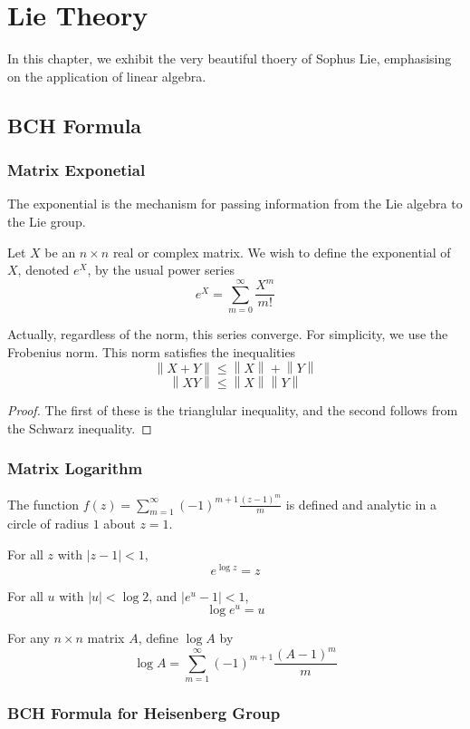
\chapter{Lie Theory}
In this chapter, we exhibit the very beautiful thoery of Sophus Lie, emphasising on the application of linear algebra.

\section{BCH Formula}
\subsection{Matrix Exponetial}
The exponential is the mechanism for passing information from the Lie algebra to the Lie group.

Let $X$ be an $n\times n$ real or complex matrix. We wish to define the exponential of $X$, denoted $e^X$, by the usual power series
\[e^X=\sum_{m=0}^\infty \frac{X^m}{m!}\] 

Actually, regardless of the norm, this series converge. For simplicity, we use the Frobenius norm. This norm satisfies the inequalities 
\[\left\|X+Y\right\|\le\left\|X\right\|+\left\|Y\right\|\]
\[\left\|XY\right\|\le \left\|X\right\|\left\|Y\right\|\] 
\begin{proof}
    The first of these is the trianglular inequality, and the second follows from the Schwarz inequality.
\end{proof}

\subsection{Matrix Logarithm}
\begin{lemma}
    The function $f(z)=\sum_{m=1}^\infty (-1)^{m+1}\frac{(z-1)^m}{m}$ is defined and analytic in a circle of radius $1$ about $z=1$.

    For all $z$ with $\left|z-1\right|<1$,\[e^{\log z}=z\] 

    For all $u$ with $\left|u\right|<\log 2$, and $\left|e^u-1\right|<1$, \[\log e^u=u\]
\end{lemma}
\begin{definition}
    For any $n\times n$ matrix $A$, define $\log A$ by \[\log A=\sum_{m=1}^\infty (-1)^{m+1}\frac{(A-1)^m}{m}\]
\end{definition}

\subsection{BCH Formula for Heisenberg Group}


